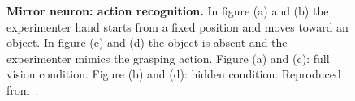 \begin{figure}
	\centering
	  \hspace{0.025\textwidth}


	  \hspace{0.025\textwidth}


	\caption[Mirror neuron: action recognition]{\textbf{Mirror neuron: action recognition.}
	In figure (a) and (b) the experimenter hand starts from a fixed position and moves 
	toward an object.  
	In figure (c) and (d) the object is absent and the experimenter mimics the
	grasping action.
	Figure (a) and (c): full vision condition. Figure (b) and (d): hidden
	condition.
	Reproduced from~\citet{umilta.etal:2001}.}
	\label{fig:actions:understanding:umilta:a}
\end{figure}
